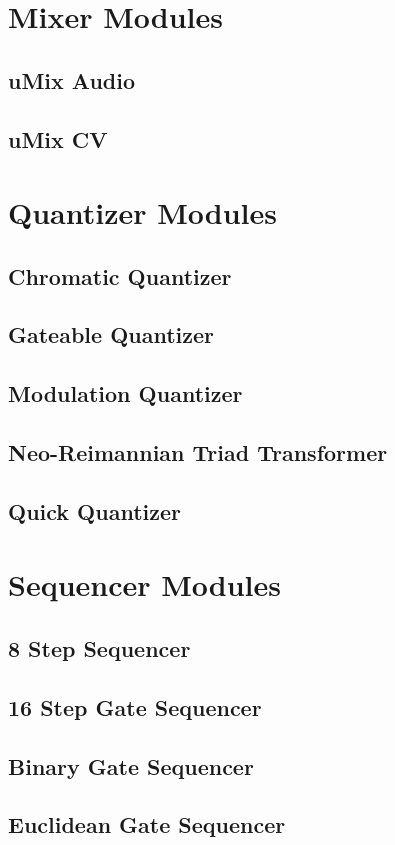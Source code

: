 \documentclass[11pt]{book}
\begin{document}
\chapter{Mixer Modules}
\section{uMix Audio}
\section{uMix CV}

\chapter{Quantizer Modules}
\section{Chromatic Quantizer}
\section{Gateable Quantizer}
\section{Modulation Quantizer}
\section{Neo-Reimannian Triad Transformer}
\section{Quick Quantizer}

\chapter{Sequencer Modules}
\section{8 Step Sequencer}
\section{16 Step Gate Sequencer}
\section{Binary Gate Sequencer}
\section{Euclidean Gate Sequencer}
\end{document}
